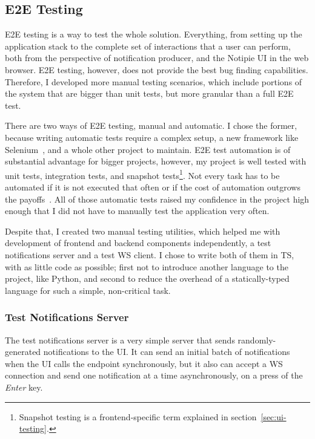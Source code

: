 \subsection{E2E Testing}\label{sec:e2e-testing}

\ac{E2E} testing is a way to test the whole solution.
Everything,
from setting up the application stack
to the complete set of interactions
that a user can perform,
both from the perspective of notification producer,
and the Notipie \ac{UI} in the web browser.
\ac{E2E} testing, however, does not provide
the best bug finding capabilities.
Therefore,
I developed more manual testing scenarios,
which include portions of the system
that are bigger than unit tests,
but more granular than a full \ac{E2E} test.

There are two ways of \ac{E2E} testing,
manual and automatic.
I chose the former,
because writing automatic tests
require a complex setup,
a new framework like Selenium~\cite{steward_selenium_2022},
and a whole other project to maintain.
\ac{E2E} test automation is of substantial advantage
for bigger projects, however,
my project is well tested with
unit tests,
integration tests, and
snapshot tests\footnote{
  Snapshot testing is a frontend-specific term
  explained in section~\ref{sec:ui-testing}.
}.
Not every task has to be automated
if it is not executed that often
or if the cost of automation outgrows
the payoffs~\cite{millett_patterns_2015}.
All of those automatic tests
raised my confidence in the project high enough
that I did not have to manually test
the application very often.

Despite that,
I created two manual testing utilities,
which helped me with development
of frontend and backend components independently,
a test notifications server
and a test \ac{WS} client.
I chose to write both of them in \ac{TS},
with as little code as possible;
first not to introduce another language
to the project, like Python,
and second to reduce the overhead
of a statically-typed language
for such a simple, non-critical task.

\subsubsection{Test Notifications Server}\label{sec:test-notifications-server}

The test notifications server
is a very simple server that sends
randomly-generated notifications to the \ac{UI}.
It can send an initial batch of notifications
when the \ac{UI} calls the endpoint synchronously,
but it also can accept a \ac{WS} connection
and send one notification at a time asynchronously,
on a press of the \textit{Enter} key.

